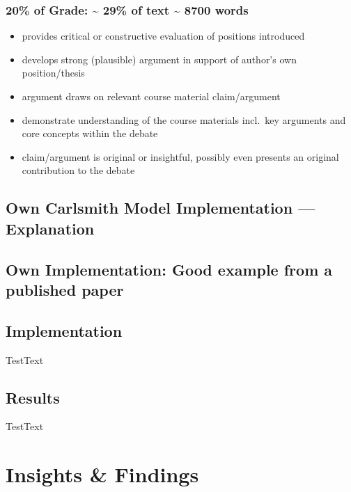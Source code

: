 \documentclass[
  letterpaper,
]{book}
\providecommand{\tightlist}{%
  \setlength{\itemsep}{0pt}\setlength{\parskip}{0pt}}
\begin{document}
\subsection{20\% of Grade: \textasciitilde{} 29\% of text
\textasciitilde{} 8700 words}\label{of-grade-29-of-text-8700-words}

\begin{itemize}
\tightlist
\item
  provides critical or constructive evaluation of positions introduced
\item
  develops strong (plausible) argument in support of author's own
  position/thesis
\item
  argument draws on relevant course material claim/argument
\item
  demonstrate understanding of the course materials incl.~key arguments
  and core concepts within the debate
\item
  claim/argument is original or insightful, possibly even presents an
  original contribution to the debate
\end{itemize}

\section{Own Carlsmith Model Implementation ---
Explanation}\label{own-carlsmith-model-implementation-explanation}

\section{Own Implementation: Good example from a published
paper}\label{own-implementation-good-example-from-a-published-paper}

\section{Implementation}\label{implementation}

TestText

\section{Results}\label{results}

TestText


\chapter{Insights \& Findings}\label{insights-findings}
\end{document}
